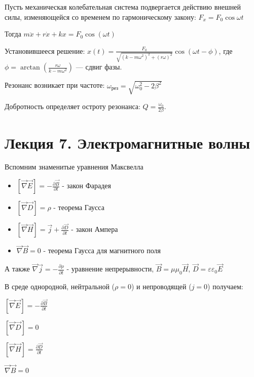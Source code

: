 \documentclass[12pt]{article}
\begin{document}
Пусть механическая колебательная система подвергается действию
внешней силы, изменяющейся со временем по гармоническому закону: $F_x = F_0 \cos \omega t$

Тогда $m\ddot{x} + r\dot{x} + kx = F_0 \cos(\omega t)$

Установившееся решение: $x(t) = \frac{F_0}{\sqrt{(k - m\omega^2)^2 + (r\omega)^2}} \cos(\omega t - \phi)$,
где $\phi = \arctan\left(\frac{r\omega}{k - m\omega^2}\right)$ — сдвиг фазы. 

Резонанс возникает при частоте: $\omega_{\text{рез}} = \sqrt{\omega_0^2 - 2\beta^2}$

Добротность определяет остроту резонанса: $Q = \frac{\omega_0}{2\beta}$.







\section{Лекция 7. Электромагнитные волны}

Вспомним знаменитые уравнения Максвелла

\begin{itemize}
    \item $[\vec \nabla \vec E] = -\frac{\partial \vec B}{\partial t}$ - закон Фарадея

    \item $[\vec \nabla \vec D] = \rho$ - теорема Гаусса

    \item $[\vec \nabla \vec H] = \vec j + \frac{\partial \vec D}{\partial t}$ - закон Ампера

    \item $\vec \nabla \vec B = 0$ - теорема Гаусса для магнитного поля
\end{itemize}

А также $\vec \nabla \vec j = -\frac{\partial \rho}{\partial t}$ - уравнение непрерывности, $\vec B = \mu \mu_0 \vec H$, $\vec D = \varepsilon \varepsilon_0 \vec E$

В среде однородной, нейтральной ($\rho = 0$) и непроводящей ($j = 0$) получаем:

\begin{multicols}{2}
    \begin{center}
        $[\vec \nabla \vec E] = -\frac{\partial \vec B}{\partial t}$

        $[\vec \nabla \vec D] = 0$

        $[\vec \nabla \vec H] = \frac{\partial \vec D}{\partial t}$

        $\vec \nabla \vec B = 0$
    \end{center}
\end{multicols}
\end{document}
